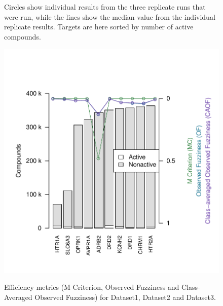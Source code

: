 \documentclass[10pt,article]{memoir}
\newcommand{\inlinetodo}[1]{{\color{magenta}\oldtodo[inline]{\color{white}\textsf{#1}}}}
\begin{document}
\begin{figure}[h!]
\begin{minipage}[t]{0.62\textwidth}
{            Circles show individual results from the three replicate runs that were
            run, while the lines show the median value from the individual replicate
            results. Targets are here sorted by number of active compounds.}
        \label{fig:21small_fill}
    \end{minipage}
    \begin{minipage}[t]{0.38\textwidth}
        \includegraphics[width=\textwidth]{figures/fig3c_10large.pdf}
        \label{fig:10large}
    \end{minipage}
    \caption{Efficiency metrics (M Criterion, Observed Fuzziness and
    Class-Averaged Observed Fuzziness) for Dataset1, Dataset2 and Dataset3.}
\end{figure}

%
%
\end{document}
